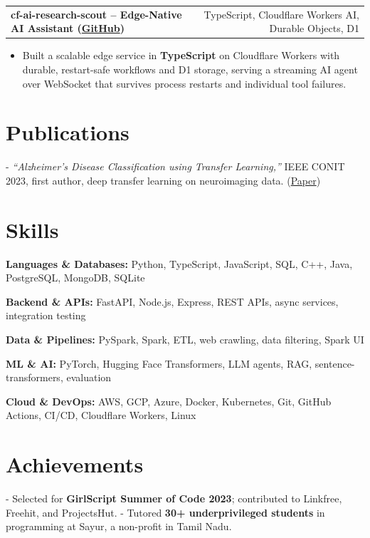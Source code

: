 \documentclass[letterpaper,11pt]{article}
\makeatletter
\newcommand{\projItem}[2]{%
  \vspace{6pt}
  \begin{tabular*}{\textwidth}{@{}l@{\extracolsep{\fill}}r@{}}
    \textbf{#1} & #2 \\
  \end{tabular*}\par\vspace{-2pt}
}
\newcommand{\skillLine}[2]{\textbf{#1:} #2\par\vspace{2pt}}
\newcommand{\inlineBlock}[1]{{\setlength{\leftskip}{0.18in}\small #1\par}}
\makeatother
\begin{document}
\projItem{cf-ai-research-scout -- Edge-Native AI Assistant {\normalfont\small(\href{https://github.com/Deva-1903/cf_ai_research_scout}{GitHub})}}{TypeScript, Cloudflare Workers AI, Durable Objects, D1}
\begin{itemize}
  \item Built a scalable edge service in \textbf{TypeScript} on Cloudflare Workers with durable, restart-safe workflows and D1 storage, serving a streaming AI agent over WebSocket that survives process restarts and individual tool failures.
\end{itemize}

\section{Publications}
\inlineBlock{- \textit{``Alzheimer's Disease Classification using Transfer Learning,''} IEEE CONIT 2023, first author, deep transfer learning on neuroimaging data. {\normalfont\small(\href{https://ieeexplore.ieee.org/document/10205760}{Paper})}}

\section{Skills}
\skillLine{Languages \& Databases}{Python, TypeScript, JavaScript, SQL, C++, Java, PostgreSQL, MongoDB, SQLite}
\skillLine{Backend \& APIs}{FastAPI, Node.js, Express, REST APIs, async services, integration testing}
\skillLine{Data \& Pipelines}{PySpark, Spark, ETL, web crawling, data filtering, Spark UI}
\skillLine{ML \& AI}{PyTorch, Hugging Face Transformers, LLM agents, RAG, sentence-transformers, evaluation}
\skillLine{Cloud \& DevOps}{AWS, GCP, Azure, Docker, Kubernetes, Git, GitHub Actions, CI/CD, Cloudflare Workers, Linux}

\section{Achievements}
\inlineBlock{- Selected for \textbf{GirlScript Summer of Code 2023}; contributed to Linkfree, Freehit, and ProjectsHut. - Tutored \textbf{30+ underprivileged students} in programming at Sayur, a non-profit in Tamil Nadu.}
\end{document}
